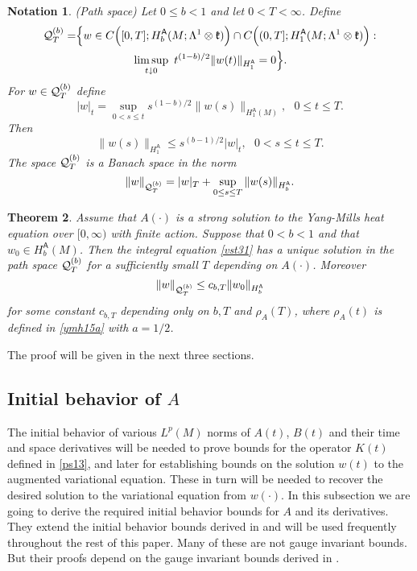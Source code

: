 \documentclass[12pt]{article}
\newtheorem{theorem}{Theorem}[section]
\newtheorem{notation}[theorem]{Notation}
\def \L{\Lambda}
\def \As{\mathsf{A}}
\def \Q{{\cal Q}}
\def \kf{\frak k}
\def \beq{\begin{equation}}
\def \eeq{\end{equation}}
\def \eref{\eqref}
\numberwithin{equation}{section}
\begin{document}
            \begin{notation} \label{notvst7b}{\rm (Path space)       
      Let $0\le b <1$ and let $0<T <\infty$.   Define
 \begin{align}
 \Q_T^{(b)} =&\Big\{w\in C\Big([0,T]; H_b^\As(M;\L^1\otimes \kf)\Big) 
                   \cap C\Big((0,T]; H_1^\As(M;\L^1\otimes \kf)\Big)    :  \notag \\       
&\qquad\qquad  \ \ \  \limsup_{t\downarrow 0}\  t^{(1-b)/2} \|w(t)\|_{H_1^\As} =0 \Big\}.         \label{vst350b}
 \end{align}
 For $w\in \Q_T^{(b)}$ define
 \beq
 |w|_t =\sup_{0 < s \le t} s^{(1-b)/2} \| w(s)\|_{H_1^\As(M)} , \ \ \ 0 \le t \le T .        \label{vst351b}
 \eeq
 Then
 \beq
 \|w(s)\|_{H_1^\As} \le s^{(b-1)/2} |w|_t,\ \ \ 0 < s \le t \le T  .                                \label{vst352b}
 \eeq
 The space $\Q_T^{(b)}$ is a Banach space in the norm
 \beq
 \|w\|_{\Q_T^{(b)}} = |w|_T + \sup_{0\le s \le T} \| w(s)\|_{H_b^\As}         .              \label{vst353b}
 \eeq
 }
 \end{notation}



            \begin{theorem}      \label{thmmild1b} 
Assume that $A(\cdot)$  is a strong solution to the Yang-Mills heat equation over $[0, \infty)$ with finite action. 
 Suppose that $ 0 < b <1$ 
 and that $w_0 \in H_b^\As(M)$. Then the  integral equation \eref{vst31} 
has a unique solution in the path space $\Q_T^{(b)}$ for a sufficiently small $T$ depending on $A(\cdot)$.
Moreover
\beq
\|w\|_{\Q_T^{(b)}} \le c_{b,T} \|w_0\|_{H_b^\As}      \label{vst360}
\eeq
for some constant $c_{b,T}$ depending only on $b, T$ and  $\rho_A(T)$, where $\rho_A(t)$ is defined in \eref{ymh15a} 
 with $a = 1/2$.  
 \end{theorem} 
 The proof will be given in the next three sections.
 




\subsection{Initial behavior of $A$}      \label{secibA}



The initial behavior of various $L^p(M)$  norms of $A(t)$, $B(t)$ and their time and space 
derivatives will be needed to prove  bounds for the operator $K(t)$ defined in \eref{ps13},
and later for establishing bounds on the solution $w(t)$ to the augmented variational equation.
 These in turn will be needed
to recover the desired solution to the variational equation from $w(\cdot)$. 
In this subsection we are going to derive the required  initial behavior bounds for $A$
and its derivatives. They extend the initial behavior bounds derived in \cite{G70} and will
be used  frequently throughout the rest of this paper.
  Many of these are not gauge invariant bounds. But their proofs depend on the
    gauge invariant bounds derived in \cite{G70}.
    
\end{document}
